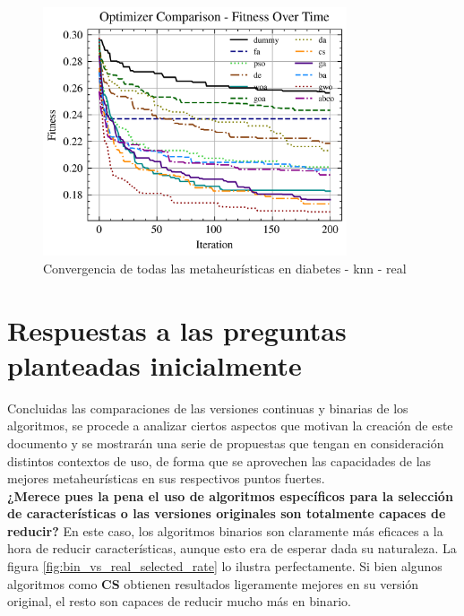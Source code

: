\begin{figure}[htp]
    \includegraphics[width=0.8\textwidth]{imagenes/fitness_charts/img/real/diabetes/optimizers_fitness_knn.png}
    \caption{Convergencia de todas las metaheurísticas en diabetes - knn - real}
\end{figure}
\clearpage

\section{Respuestas a las preguntas planteadas inicialmente}
Concluidas las comparaciones de las versiones continuas y binarias de los algoritmos, se procede a analizar ciertos aspectos que motivan la creación de este documento y se mostrarán una serie de propuestas que tengan en consideración distintos contextos de uso, de forma que se aprovechen las capacidades de las mejores metaheurísticas en sus respectivos puntos fuertes.\\[6pt]
\textbf{¿Merece pues la pena el uso de algoritmos específicos para la selección de características o las versiones originales son totalmente capaces de reducir?} En este caso, los algoritmos binarios son claramente más eficaces a la hora de reducir características, aunque esto era de esperar dada su naturaleza. La figura \ref{fig:bin_vs_real_selected_rate} lo ilustra perfectamente. Si bien algunos algoritmos como \textbf{CS} obtienen resultados ligeramente mejores en su versión original, el resto son capaces de reducir mucho más en binario.

